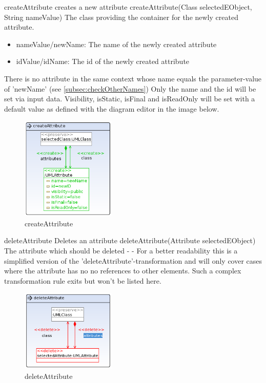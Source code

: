 \op
{createAttribute}
{creates a new attribute}
{createAttribute(Class selectedEObject, String nameValue)}
{The class providing the container for the newly created attribute.}
{
\begin{itemize}
 \item nameValue/newName: The name of the newly created attribute
 \item idValue/idName: The id of the newly created attribute
\end{itemize}
}
{There is no attribute in the same context whose name equals the parameter-value
of 'newName' (see
\ref{subsec:checkOtherNames})} 
{Only the name and the id will be set via input data. Visibility, isStatic,
isFinal and isReadOnly will be set with a default value as defined with the
diagram editor in the image below.} \begin{figure}[H]
  \centering
  \includegraphics[width=0.4\textwidth]{pics/createAttributeInClass.png}    
  \caption{createAttribute}
  \label{createAttribute}  
\end{figure}
\op
{deleteAttribute}
{Deletes an attribute}
{deleteAttribute(Attribute selectedEObject)}
{The attribute which should be deleted} {-}
{-}
{For a better readability this is a simplified version of the
'deleteAttribute'-transformation and will only cover cases where the attribute
has no no references to other elements. Such a complex
transformation rule exits but won't be listed here.}
\begin{figure}[H]
  \centering
  \includegraphics[width=0.4\textwidth]{pics/deleteAttribute_emptyAndUnreferenced.png}    
  \caption{deleteAttribute}
  \label{deleteAttribute}  
\end{figure}
